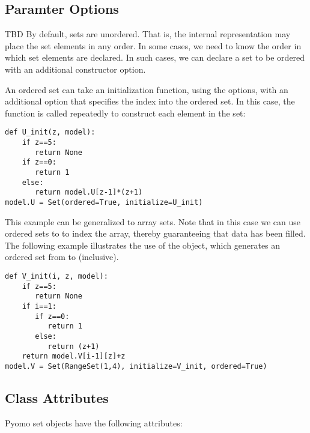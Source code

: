 \subsection{Paramter Options}

TBD
By default, sets are unordered.  That is, the internal representation
may place the set elements in any order.  In some cases, we need to know
the order in which set elements are declared.  In such cases, we can declare
a set to be ordered with an additional constructor option.  

An ordered set can take an 
initialization function, using the  options, with an additional option 
that specifies the index into the ordered set.  In this case, the function is 
called repeatedly to construct each element in the set:
\begin{lstlisting}
def U_init(z, model):
    if z==5:
       return None
    if z==0:
       return 1
    else:
       return model.U[z-1]*(z+1)
model.U = Set(ordered=True, initialize=U_init)
\end{lstlisting}
This example can be generalized to array sets.  Note that in this case
we can use ordered sets to to index the array, thereby guaranteeing that
data has been filled.  The following example illustrates the use of the
 object, which generates an ordered set from  to 
(inclusive).
\begin{lstlisting}
def V_init(i, z, model):
    if z==5:
       return None
    if i==1:
       if z==0:
          return 1
       else:
          return (z+1)
    return model.V[i-1][z]+z
model.V = Set(RangeSet(1,4), initialize=V_init, ordered=True)
\end{lstlisting}
\fi

\subsection{Class Attributes}

Pyomo set objects have the following attributes:

